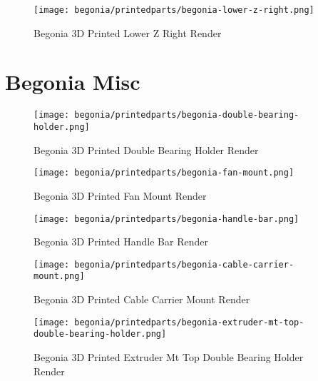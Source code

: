 \begin{figure}[H]
\centering
\texttt{[image: begonia/printedparts/begonia-lower-z-right.png]}
\caption{Begonia 3D Printed Lower Z Right Render}
\label{fig:beglowzright}
\end{figure}


\section{Begonia Misc}

\begin{figure}[H]
\centering
\texttt{[image: begonia/printedparts/begonia-double-bearing-holder.png]}
\caption{Begonia 3D Printed Double Bearing Holder Render}
\label{fig:begdoublebearingholder}
\end{figure}

\begin{figure}[H]
\centering
\texttt{[image: begonia/printedparts/begonia-fan-mount.png]}
\caption{Begonia 3D Printed Fan Mount Render}
\label{fig:begfanmount}
\end{figure}

\begin{figure}[H]
\centering
\texttt{[image: begonia/printedparts/begonia-handle-bar.png]}
\caption{Begonia 3D Printed Handle Bar Render}
\label{fig:beghandlebar}
\end{figure}

\begin{figure}[H]
\centering
\texttt{[image: begonia/printedparts/begonia-cable-carrier-mount.png]}
\caption{Begonia 3D Printed Cable Carrier Mount Render}
\label{fig:begcablecarriermount}
\end{figure}

\begin{figure}[H]
\centering
\texttt{[image: begonia/printedparts/begonia-extruder-mt-top-double-bearing-holder.png]}
\caption{Begonia 3D Printed Extruder Mt Top Double Bearing Holder Render}
\label{fig:begextrudermttop}
\end{figure}


